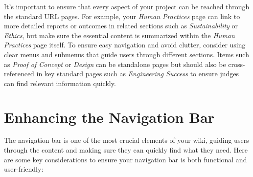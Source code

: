 It’s important to ensure that every aspect of your project can be reached through the standard URL pages.
For example, your \textit{Human Practices} page can link to more detailed reports or outcomes in related sections such as \textit{Sustainability} or \textit{Ethics}, but make sure the essential content is summarized within the \textit{Human Practices} page itself. \newline
To ensure easy navigation and avoid clutter, consider using clear menus and submenus that guide users through different sections.
Items such as \textit{Proof of Concept} or \textit{Design} can be standalone pages but should also be cross-referenced in key standard pages such as \textit{Engineering Success} to ensure judges can find relevant information quickly.


\section{Enhancing the Navigation Bar} 
The navigation bar is one of the most crucial elements of your wiki, guiding users through the content and making sure they can quickly find what they need.
Here are some key considerations to ensure your navigation bar is both functional and user-friendly:
